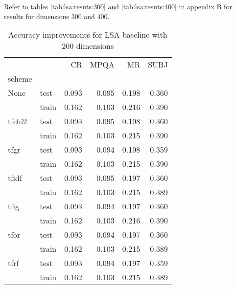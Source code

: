     Refer to tables \ref{tab:lsa:resuts:300} and \ref{tab:lsa:resuts:400} in appendix B for results for dimensions $300$ and $400$.
    
\begin{table}[H]
\begin{center}

\begin{tabular}{llrrrr}
\toprule
{} &      &  CR &  MPQA &  MR &  SUBJ \\
scheme &  &            &              &            &              \\
\midrule
None & test &      0.093 &        0.095 &      0.198 &        0.360 \\
{} & train &      0.162 &        0.103 &      0.216 &        0.390 \\
tfchi2 & test &      0.093 &        0.095 &      0.198 &        0.360 \\
{} & train &      0.162 &        0.103 &      0.215 &        0.390 \\
tfgr & test &      0.093 &        0.094 &      0.198 &        0.359 \\
{} & train &      0.162 &        0.103 &      0.215 &        0.390 \\
tfidf & test &      0.093 &        0.095 &      0.197 &        0.360 \\
{} & train &      0.162 &        0.103 &      0.215 &        0.389 \\
tfig & test &      0.093 &        0.094 &      0.197 &        0.360 \\
{} & train &      0.162 &        0.103 &      0.216 &        0.390 \\
tfor & test &      0.093 &        0.094 &      0.197 &        0.360 \\
{} & train &      0.162 &        0.103 &      0.215 &        0.389 \\
tfrf & test &      0.093 &        0.094 &      0.197 &        0.359 \\
{} & train &      0.162 &        0.103 &      0.215 &        0.389 \\
\bottomrule
\end{tabular}

\caption[Accuracy improvements for LSA baseline with 200 dimensions]{Accuracy improvements for LSA baseline with 200 dimensions}
\label{tab:}
\end{center}
\end{table}

    
